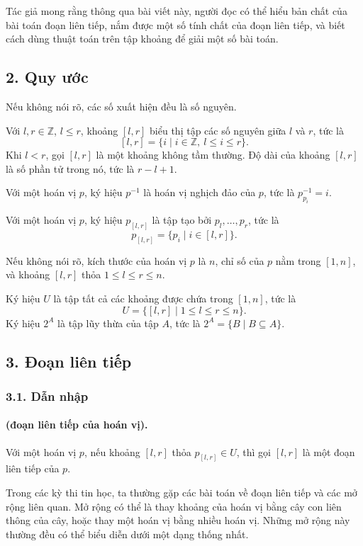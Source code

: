 \documentclass[11pt]{article}
\begin{document}
Tác giả mong rằng thông qua bài viết này, người đọc có thể hiểu bản chất của
bài toán đoạn liên tiếp, nắm được một số tính chất của đoạn liên tiếp, và biết
cách dùng thuật toán trên tập khoảng để giải một số bài toán.

\subsection*{2. Quy ước}

Nếu không nói rõ, các số xuất hiện đều là số nguyên.

Với $l,r\in\mathbb Z$, $l\le r$, khoảng $[l,r]$ biểu thị tập các số nguyên giữa
$l$ và $r$, tức là
\[
  [l,r]=\{i\mid i\in\mathbb Z,\ l\le i\le r\}.
\]
Khi $l<r$, gọi $[l,r]$ là một khoảng không tầm thường. Độ dài của khoảng
$[l,r]$ là số phần tử trong nó, tức là $r-l+1$.

Với một hoán vị $p$, ký hiệu $p^{-1}$ là hoán vị nghịch đảo của $p$, tức là
$p^{-1}_{p_i}=i$.

Với một hoán vị $p$, ký hiệu $p_{[l,r]}$ là tập tạo bởi
$p_l,\ldots,p_r$, tức là
\[
  p_{[l,r]}=\{p_i\mid i\in[l,r]\}.
\]

Nếu không nói rõ, kích thước của hoán vị $p$ là $n$, chỉ số của $p$ nằm trong
$[1,n]$, và khoảng $[l,r]$ thỏa $1\le l\le r\le n$.

Ký hiệu $U$ là tập tất cả các khoảng được chứa trong $[1,n]$, tức là
\[
  U=\{[l,r]\mid 1\le l\le r\le n\}.
\]
Ký hiệu $2^A$ là tập lũy thừa của tập $A$, tức là
$2^A=\{B\mid B\subseteq A\}$.

\subsection*{3. Đoạn liên tiếp}

\subsubsection*{3.1. Dẫn nhập}

\paragraph{ (đoạn liên tiếp của hoán vị).}
Với một hoán vị $p$, nếu khoảng $[l,r]$ thỏa $p_{[l,r]}\in U$, thì gọi
$[l,r]$ là một đoạn liên tiếp của $p$.

Trong các kỳ thi tin học, ta thường gặp các bài toán về đoạn liên tiếp và các
mở rộng liên quan. Mở rộng có thể là thay khoảng của hoán vị bằng cây con liên
thông của cây, hoặc thay một hoán vị bằng nhiều hoán vị. Những mở rộng này
thường đều có thể biểu diễn dưới một dạng thống nhất.
\end{document}
